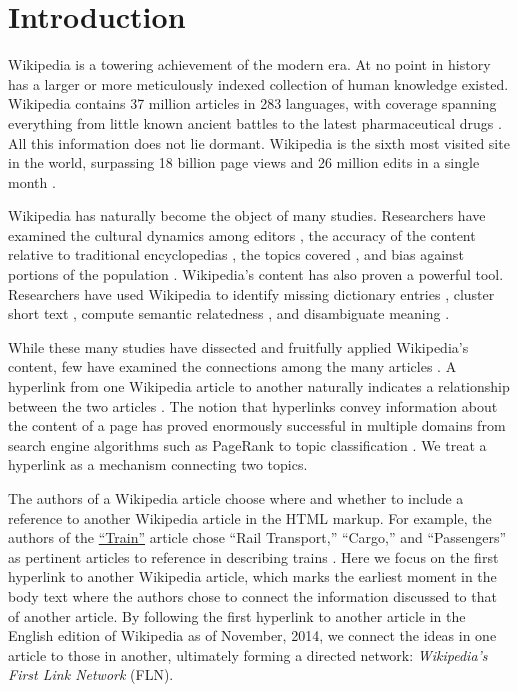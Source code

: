 \documentclass[pre,twocolumn,twoside,superscriptaddress,floatfix, aps, 10pt]{revtex4-1}
\begin{document}
\maketitle

\section{Introduction}

Wikipedia is a towering achievement of the modern era. 
At no point in history has a larger or more meticulously indexed collection of human knowledge 
existed.
Wikipedia contains 37 million articles in 283 languages, 
with coverage spanning everything from little known ancient battles to the latest pharmaceutical drugs 
\cite{drugs, stats}.
All this information does not lie dormant. 
Wikipedia is the sixth most visited
site in the world, surpassing 18 billion page views and 26 million edits in a single month
\cite{wiki_edits, wiki_views}.

Wikipedia has naturally become the object of many studies. 
Researchers have examined the cultural dynamics among editors
\cite{editors},
the accuracy of the content relative to traditional encyclopedias
\cite{accuracy1, accuracy2},
the topics covered 
\cite{coverage},
and bias against portions of the population
\cite{bias_women}.
Wikipedia's content has also proven a powerful tool. 
Researchers have used Wikipedia to identify missing dictionary entries
\cite{missing_entries},
cluster short text
\cite{clustering},
compute semantic relatedness
\cite{semantic_relatedness},
and disambiguate meaning \cite{disambiguating}.

While these many studies have dissected and fruitfully applied Wikipedia's content,
few have examined the connections among the many articles
\cite{links_that_speak}.
A hyperlink from one Wikipedia article to another
naturally indicates a relationship between the two articles
\cite{relevance}.
The notion that hyperlinks convey information about the content of a
page has proved enormously successful in multiple domains from search engine algorithms 
such as PageRank 
\cite{pagerank} 
to topic classification
\cite{classifier}.
We treat a hyperlink as a mechanism connecting two topics.

The authors of a Wikipedia article choose where and whether to include a 
reference to another Wikipedia article
in the HTML markup.
For example, the authors of the 
\href{https://en.wikipedia.org/wiki/Train}{``Train''}
article chose
``Rail Transport,'' ``Cargo,'' and ``Passengers'' 
as pertinent articles to reference in describing trains
\cite{wiki_train}
.
Here we focus on the first hyperlink to another Wikipedia article, which 
marks the earliest moment in the body text where the authors
chose to connect the information discussed to that of another article.
By following the first hyperlink to another article in the English edition of
Wikipedia as of November, 2014, we connect the ideas in one article to those in another, ultimately forming a directed network: 
{\it Wikipedia's First Link Network} (FLN).
\end{document}
